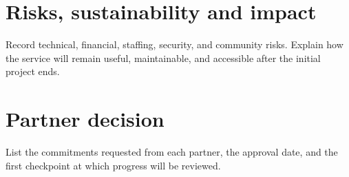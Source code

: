 \documentclass[11pt,a4paper]{article}
\begin{document}
\section{Risks, sustainability and impact}
Record technical, financial, staffing, security, and community risks. Explain
how the service will remain useful, maintainable, and accessible after the
initial project ends.
\section{Partner decision}
List the commitments requested from each partner, the approval date, and the
first checkpoint at which progress will be reviewed.
\end{document}

